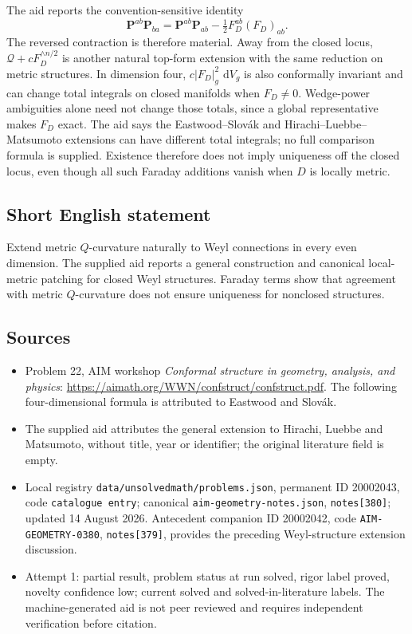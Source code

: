 \documentclass[11pt]{article}
\newcommand{\dd}{\,\mathrm{d}}
\begin{document}
The aid reports the convention-sensitive identity
\[
\mathbf P^{ab}\mathbf P_{ba}
=\mathbf P^{ab}\mathbf P_{ab}-\tfrac12F_D^{ab}(F_D)_{ab}.
\]
The reversed contraction is therefore material. Away from the closed locus, \(\mathcal Q+cF_D^{\wedge n/2}\) is another natural top-form extension with the same reduction on metric structures. In dimension four, \(c|F_D|_g^2\,\dd V_g\) is also conformally invariant and can change total integrals on closed manifolds when \(F_D\ne0\). Wedge-power ambiguities alone need not change those totals, since a global representative makes \(F_D\) exact. The aid says the Eastwood--Slov\'ak and Hirachi--Luebbe--Matsumoto extensions can have different total integrals; no full comparison formula is supplied. Existence therefore does not imply uniqueness off the closed locus, even though all such Faraday additions vanish when \(D\) is locally metric.
\subsection{Short English statement}
Extend metric \(Q\)-curvature naturally to Weyl connections in every even dimension. The supplied aid reports a general construction and canonical local-metric patching for closed Weyl structures. Faraday terms show that agreement with metric \(Q\)-curvature does not ensure uniqueness for nonclosed structures.
\subsection{Sources}
\begin{itemize}
\item Problem 22, AIM workshop \emph{Conformal structure in geometry, analysis, and physics}: \url{https://aimath.org/WWN/confstruct/confstruct.pdf}. The following four-dimensional formula is attributed to Eastwood and Slov\'ak.
\item The supplied aid attributes the general extension to Hirachi, Luebbe and Matsumoto, without title, year or identifier; the original literature field is empty.
\item Local registry \texttt{data/unsolvedmath/problems.json}, permanent ID 20002043, code \texttt{catalogue entry}; canonical \texttt{aim-geometry-notes.json}, \texttt{notes[380]}; updated 14 August 2026. Antecedent companion ID 20002042, code \texttt{AIM-GEOMETRY-0380}, \texttt{notes[379]}, provides the preceding Weyl-structure extension discussion.
\item Attempt 1: partial result, problem status at run solved, rigor label proved, novelty confidence low; current solved and solved-in-literature labels. The machine-generated aid is not peer reviewed and requires independent verification before citation.
\end{itemize}
\end{document}
